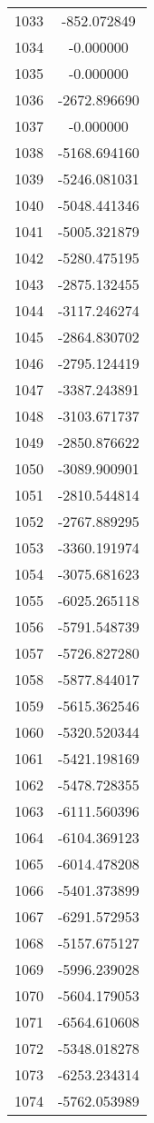 \documentclass[12pt]{article}
\begin{document}
\begin{longtable}{@{}cc@{}}
1033 & -852.072849 \\
1034 & -0.000000 \\
1035 & -0.000000 \\
1036 & -2672.896690 \\
1037 & -0.000000 \\
1038 & -5168.694160 \\
1039 & -5246.081031 \\
1040 & -5048.441346 \\
1041 & -5005.321879 \\
1042 & -5280.475195 \\
1043 & -2875.132455 \\
1044 & -3117.246274 \\
1045 & -2864.830702 \\
1046 & -2795.124419 \\
1047 & -3387.243891 \\
1048 & -3103.671737 \\
1049 & -2850.876622 \\
1050 & -3089.900901 \\
1051 & -2810.544814 \\
1052 & -2767.889295 \\
1053 & -3360.191974 \\
1054 & -3075.681623 \\
1055 & -6025.265118 \\
1056 & -5791.548739 \\
1057 & -5726.827280 \\
1058 & -5877.844017 \\
1059 & -5615.362546 \\
1060 & -5320.520344 \\
1061 & -5421.198169 \\
1062 & -5478.728355 \\
1063 & -6111.560396 \\
1064 & -6104.369123 \\
1065 & -6014.478208 \\
1066 & -5401.373899 \\
1067 & -6291.572953 \\
1068 & -5157.675127 \\
1069 & -5996.239028 \\
1070 & -5604.179053 \\
1071 & -6564.610608 \\
1072 & -5348.018278 \\
1073 & -6253.234314 \\
1074 & -5762.053989 \\

\end{longtable}
\end{document}

